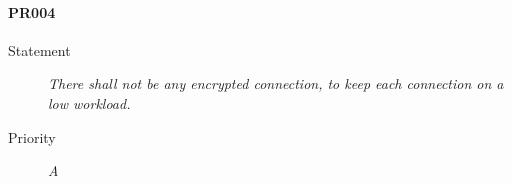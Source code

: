 \paragraph{PR004}
  \begin{description}
  \item [Statement] 
    \textit{ There shall not be any encrypted connection, to keep each connection on a low workload.}
  \item [Priority] \textit{A}
\end{description}